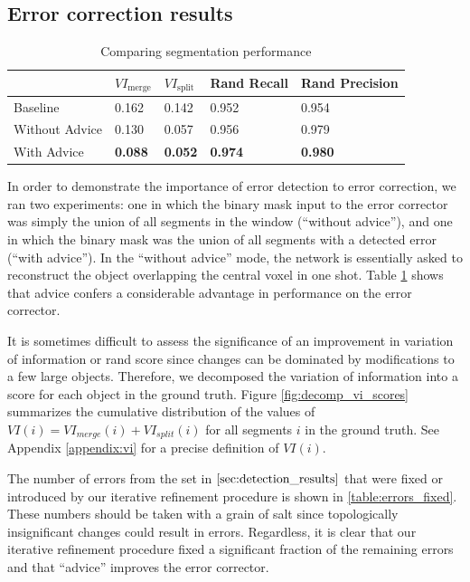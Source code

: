 \documentclass{article}
\begin{document}
\subsection{Error correction results}
\begin{table}[h]
  \caption{Comparing segmentation performance}
  \label{table:vi_scores}
  \centering
  \begin{tabular}{lllll}
    \toprule
	& $VI_\text{merge}$ & $VI_\text{split}$ & Rand Recall & Rand Precision\\
    \midrule
    Baseline & 0.162 & 0.142 & 0.952 & 0.954\\
    Without Advice & 0.130 & 0.057 & 0.956 & 0.979\\
	With Advice & \textbf{0.088} & \textbf{0.052} & \textbf{0.974} & \textbf{0.980}\\
    \bottomrule
  \end{tabular}
\end{table}

In order to demonstrate the importance of error detection to error correction, we ran two experiments: one in which the binary mask input to the error corrector was simply the union of all segments in the window (``without advice''), and one in which the binary mask was the union of all segments with a detected error (``with advice''). In the ``without advice'' mode, the network is essentially asked to reconstruct the object overlapping the central voxel in one shot. Table \ref{table:vi_scores} shows that advice confers a considerable advantage in performance on the error corrector.

It is sometimes difficult to assess the significance of an improvement in variation of information or rand score since changes can be dominated by modifications to a few large objects. Therefore, we decomposed the variation of information into a score for each object in the ground truth. Figure \ref{fig:decomp_vi_scores} summarizes the cumulative distribution of the values of $VI(i)=VI_{merge}(i)+VI_{split}(i)$ for all segments $i$ in the ground truth. See Appendix \ref{appendix:vi} for a precise definition of $VI(i)$.

The number of errors from the set in $\ref{sec:detection_results}$ that were fixed or introduced by our iterative refinement procedure is shown in \ref{table:errors_fixed}. These numbers should be taken with a grain of salt since topologically insignificant changes could result in errors. Regardless, it is clear that our iterative refinement procedure fixed a significant fraction of the remaining errors and that ``advice'' improves the error corrector.
\end{document}
